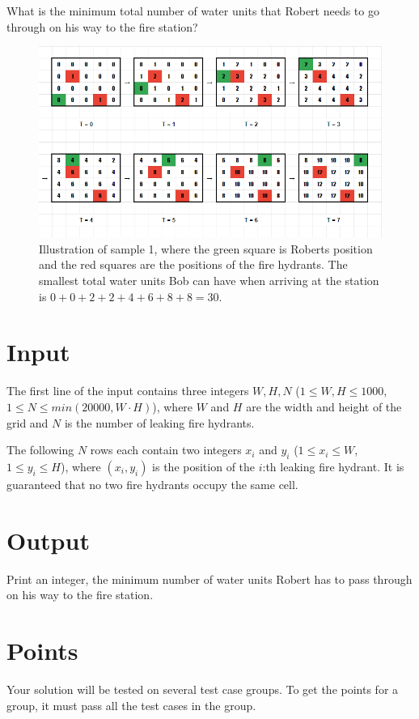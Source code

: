 What is the minimum total number of water units that Robert needs to go through on his way to the fire station?


\begin{centering}
  \begin{figure}[h]
    \centering
  \includegraphics[width=1\textwidth]{brandpostSample1.png}
    \caption{Illustration of sample 1, where the green square is Roberts position and the
    red squares are the positions of the fire hydrants. The smallest total water units
    Bob can have when arriving at the station is $0+0+2+2+4+6+8+8=30$.}
    \label{fig:brandpost}
  \end{figure}
\end{centering}

\section*{Input}
The first line of the input contains three integers $W,H,N$ ($1 \le W,H \le 1000$, $1 \le N \le min(20000,W \cdot H)$), 
where $W$ and $H$ are the width and height of the grid and $N$ is the number of leaking fire hydrants.

The following $N$ rows each contain two integers $x_i$ and $y_i$ ($1 \le x_i \le W$, $1 \le y_i \le H$),
where $(x_i,y_i)$ is the position of the $i$:th leaking fire hydrant. It is guaranteed that no two
fire hydrants occupy the same cell.

\section*{Output}
Print an integer, the minimum number of water units Robert has to pass through on his way to the fire station.

\section*{Points}
Your solution will be tested on several test case groups.
To get the points for a group, it must pass all the test cases in the group.

